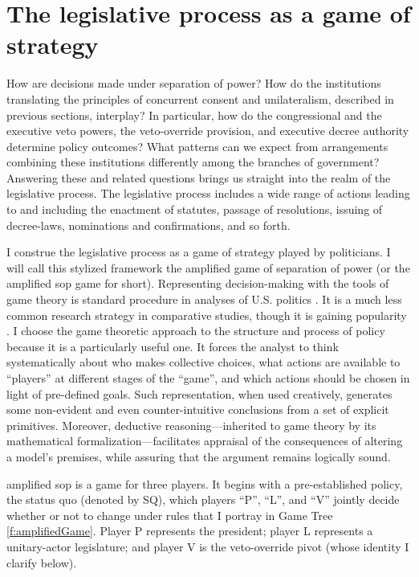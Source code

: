 \section{The legislative process as a game of strategy}

How are decisions made under separation of power?  How do the institutions translating the principles of concurrent consent and unilateralism, described in previous sections, interplay?  In particular, how do the congressional and the executive veto powers, the veto-override provision, and executive decree authority determine policy outcomes?  What patterns can we expect from arrangements combining these institutions differently among the branches of government?  Answering these and related questions brings us straight into the realm of the legislative process.  The legislative process includes a wide range of actions leading to and including the enactment of statutes, passage of resolutions, issuing of decree-laws, nominations and confirmations, and so forth.  

I construe the legislative process as a game of strategy played by politicians.  I will call this stylized framework the amplified game of separation of power (or the amplified sop game for short).  Representing decision-making with the tools of game theory is standard procedure in analyses of U.S. politics \citep[eg.][]{shepsle.1979,ingberman.yao.1991,krehbiel.1996,cox.1999,mccarty.2000,cameron.2000}.  It is a much less common research strategy in comparative studies, though it is gaining popularity \citep[eg.][]{huber.1996a,cox.1997,diermeier.feddersen.1998,baron.ferejohn.1989,londregan.2000a}.  I choose the game theoretic approach to the structure and process of policy because it is a particularly useful one.  It forces the analyst to think systematically about who makes collective choices, what actions are available to ``players'' at different stages of the ``game'', and which actions should be chosen in light of pre-defined goals.  Such representation, when used creatively, generates some non-evident and even counter-intuitive conclusions from a set of explicit primitives.  Moreover, deductive reasoning---inherited to game theory by its mathematical formalization---facilitates appraisal of the consequences of altering a model's premises, while assuring that the argument remains logically sound.  

amplified sop is a game for three players.  It begins with a pre-established policy, the status quo (denoted by SQ), which players ``P'', ``L'', and ``V'' jointly decide whether or not to change under rules that I portray in Game Tree \ref{f:amplifiedGame}. Player P represents the president; player L represents a unitary-actor legislature; and player V is the veto-override pivot (whose identity I clarify below).  

